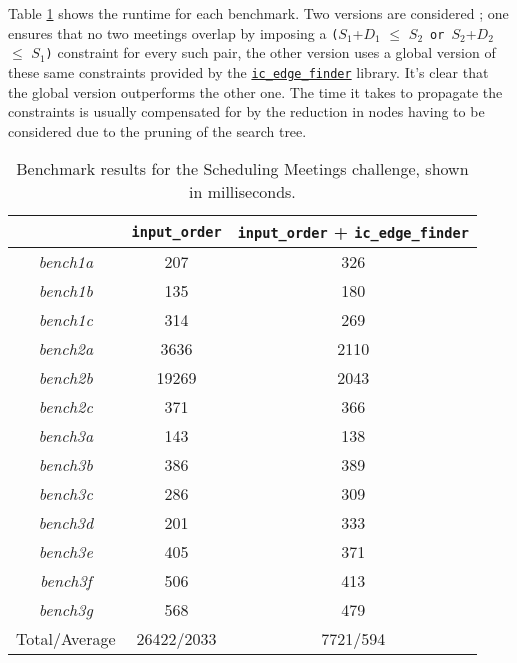 Table \ref{tab:sche1} shows the runtime for each benchmark. Two versions are considered ; one ensures that no two meetings overlap by imposing a \texttt{(}$S_1$+$D_1$ $\leq$ $S_2$\ \texttt{or}\ $S_2$+$D_2$ $\leq$ $S_1$\texttt{)} constraint for every such pair, the other version uses a global version of these same constraints provided by the \href{http://eclipseclp.org/doc/bips/lib/ic_edge_finder/index.html}{\texttt{ic\_edge\_finder}} library. It's clear that the global version outperforms the other one. The time it takes to propagate the constraints is usually compensated for by the reduction in nodes having to be considered due to the pruning of the search tree.

\begin{table}[H]
\footnotesize
\centering
\bgroup
\def\arraystretch{1.3}
\begin{tabular}{ccc}
\multicolumn{1}{l}{} & \texttt{input\_order} & \texttt{input\_order} + \texttt{ic\_edge\_finder} \\ \hline
\textit{bench1a}  & 207 & 326 \\
\textit{bench1b}  & 135 & 180                                 \\
\textit{bench1c}  & 314   & 269                                 \\
\textit{bench2a}  & 3636   & 2110                                 \\
\textit{bench2b}  & 19269   & 2043                                 \\
\textit{bench2c}  & 371   & 366                                 \\
\textit{bench3a}  & 143   & 138                                 \\
\textit{bench3b}  & 386   & 389                                 \\
\textit{bench3c}  & 286   & 309                                 \\
\textit{bench3d}  & 201   & 333                                 \\
\textit{bench3e}  & 405   & 371                                 \\
\textit{bench3f}   & 506   & 413                                 \\
\textit{bench3g}  & 568   & 479                                 \\\hline
Total/Average     & 26422/2033   & 7721/594                       
\end{tabular}
\egroup
\caption{Benchmark results for the Scheduling Meetings challenge, shown in milliseconds.}
\label{tab:sche1}
\end{table}

